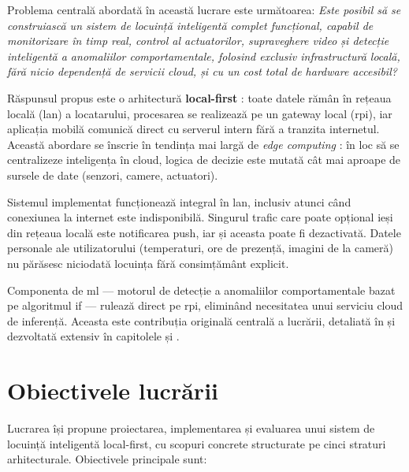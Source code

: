 Problema centrală abordată în această lucrare este următoarea:
\emph{Este posibil să se construiască un sistem de locuință inteligentă complet
funcțional, capabil de monitorizare în timp real, control al actuatorilor,
supraveghere video și detecție inteligentă a anomaliilor comportamentale,
folosind exclusiv infrastructură locală, fără nicio dependență de servicii cloud,
și cu un cost total de hardware accesibil?}

Răspunsul propus este o arhitectură \textbf{local-first}
\cite{kleppmann2019localfirst}: toate datele rămân în rețeaua locală (\gls{lan})
a locatarului, procesarea se realizează pe un gateway local (\gls{rpi}), iar
aplicația mobilă comunică direct cu serverul intern fără a tranzita internetul.
Această abordare se înscrie în tendința mai largă de \emph{edge computing}
\cite{shi2016edge,premsankar2018edgeiot}: în loc să se centralizeze inteligența
în cloud, logica de decizie este mutată cât mai aproape de sursele de date
(senzori, camere, actuatori).

Sistemul implementat funcționează integral în \gls{lan}, inclusiv atunci când
conexiunea la internet este indisponibilă. Singurul trafic care poate opțional
ieși din rețeaua locală este notificarea push, iar și aceasta poate fi dezactivată.
Datele personale ale utilizatorului (temperaturi, ore de prezență, imagini de la
cameră) nu părăsesc niciodată locuința fără consimțământ explicit.

Componenta de \gls{ml} — motorul de detecție a anomaliilor comportamentale bazat
pe algoritmul \gls{if} — rulează direct pe \gls{rpi}, eliminând necesitatea
unui serviciu cloud de inferență. Aceasta este contribuția originală centrală a
lucrării, detaliată în  și dezvoltată extensiv în
capitolele  și .

\section{Obiectivele lucrării}
\label{sec:obiective}

Lucrarea își propune proiectarea, implementarea și evaluarea unui sistem de
locuință inteligentă local-first, cu scopuri concrete structurate pe cinci
straturi arhitecturale. Obiectivele principale sunt:

